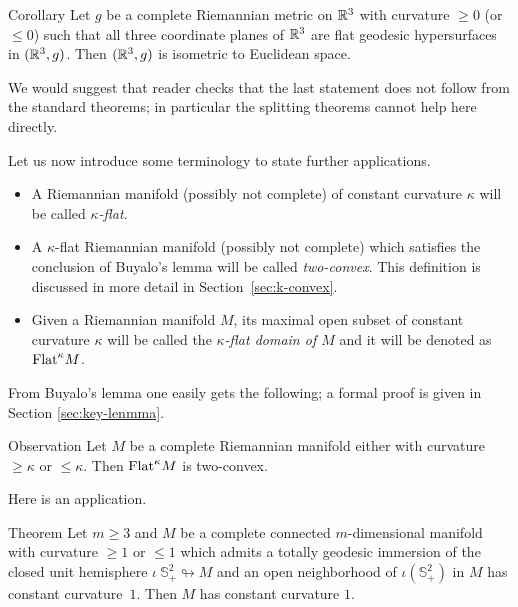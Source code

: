 \documentclass[oneside,a4paper]{article}
\begin{document}
\begin{thm}{Corollary}
Let $g$ be a complete Riemannian metric on $\mathbb{R}^3$ with curvature $\ge 0$ (or $\le 0$)
such that all three coordinate planes of $\mathbb{R}^3$
are flat geodesic hypersurfaces in $(\mathbb{R}^3,g)$.
Then $(\mathbb{R}^3,g)$ is isometric to Euclidean space.
\end{thm}

We would suggest that reader checks that the last statement does not follow from the standard theorems;
in particular the splitting theorems cannot help here directly.

\medskip

Let us now introduce some terminology to state further applications.
\begin{itemize}
\item A Riemannian manifold (possibly not complete) of constant curvature $\kappa$ will be called \emph{$\kappa$-flat}.
\item A $\kappa$-flat Riemannian manifold (possibly not complete)
which satisfies the conclusion of Buyalo's lemma will be called \emph{two-convex}.
This definition is discussed in more detail in Section~\ref{sec:k-convex}.
\item Given a Riemannian manifold $M$, its maximal open subset of constant curvature $\kappa$ will be called the \emph{$\kappa$-flat domain of $M$}
and it will be denoted as $\mathrm{Flat}^\kappa M$.
\end{itemize}

From Buyalo's lemma one easily gets the following;
a formal proof is given in Section \ref{sec:key-lenmma}.

\begin{thm}{Observation}\label{obs:flat-domain}
Let $M$ be a complete Riemannian manifold either with curvature $\ge \kappa$ or $\le \kappa$.
Then $\mathrm{Flat}^\kappa M$ is two-convex.
\end{thm}

Here is an application.

\begin{thm}{Theorem}\label{thm:rigid-sphere}
Let $m\ge 3$ and $M$ be a complete connected $m$-dimensional manifold
with curvature $\ge 1$ or $\le 1$ which admits a totally geodesic immersion of the closed unit hemisphere $\iota\:\mathbb S^2_+\looparrowright M$
and an open neighborhood of $\iota(\mathbb S^2_+)$ in $M$ has constant curvature~$1$.
Then $M$ has constant curvature $1$.
\end{thm}
\end{document}
